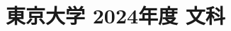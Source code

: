 ﻿\documentclass[../../uem_mat_tok_q.tex]{subfiles}
\begin{document}
    \section{東京大学 2024年度 文科}
    \subsection{　}
    
    \vfill
    \subsection{　}
    
    \vfill
    \newpage
    \subsection{　}
    
    \vfill
    \subsection{　}
    
    \vfill
\end{document}

